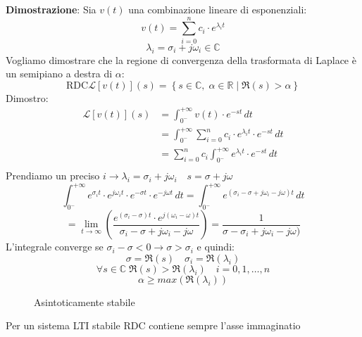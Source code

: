 \documentclass[a4paper]{article}
\begin{document}
\textbf{Dimostrazione}:
Sia \( v(t) \) una combinazione lineare di esponenziali:
\[
  v(t) = \sum_{i=0}^{n} c_i \cdot e^{\lambda_i t}
\] 
\[
\lambda_i = \sigma_i + j \omega_i \in \mathbb{C}
\] 
Vogliamo dimostrare che la regione di convergenza della trasformata di Laplace è un
semipiano a destra di \( \alpha \):
\[
  \text{RDC} \mathcal{L}[v(t)](s) = \left\{ s \in \mathbb{C},\; \alpha \in \mathbb{R} \; | \; \Re(s) > \alpha \right\}
\] 
Dimostro:
\[
  \begin{aligned}
    \mathcal{L}[v(t)](s) &= \int_{0^-}^{+\infty} v(t) \cdot e^{-st} \, dt \\
                         &= \int_{0^-}^{+\infty} \sum_{i=0}^{n} c_i \cdot e^{\lambda_i t} \cdot e^{-st} \, dt\\
                         &= \sum_{i=0}^{n} c_i \int_{0^-}^{+\infty} e^{\lambda_i t} \cdot e^{-st} \, dt\\
  \end{aligned}
\] 
Prendiamo un preciso \( i \to \lambda_i = \sigma_i + j \omega_i \quad s = \sigma + j \omega\) 
\[
  \int_{0^-}^{+\infty} e^{\sigma_i t} \cdot e^{j \omega_i t} \cdot e^{-\sigma t} \cdot e^{-j \omega t} \, dt =
  \int_{0^-}^{+\infty} e^{(\sigma_i - \sigma + j \omega_i - j \omega) t} \, dt
\] 
\[
  = \lim_{t \to \infty} \left( \frac{e^{(\sigma_i - \sigma) t} \cdot e^{j (\omega_i - \omega) t}}
  {\sigma_i - \sigma + j \omega_i - j \omega} \right)
  = \frac{1}{\sigma - \sigma_i + j \omega_i - j\omega)}
\] 
L'integrale converge se \( \sigma_i - \sigma < 0 \to \sigma > \sigma_i \) e quindi:
\[
\sigma  = \Re(s) \quad \sigma_i = \Re(\lambda_i)
\] 
\[
\forall s \in \mathbb{C} \; \Re(s) > \Re(\lambda_i) \quad i = 0,1,\ldots,n
\] 
\[
\alpha \ge max(\Re(\lambda_i))
\] 
\begin{figure}[H]
  \centering
  \caption{Asintoticamente stabile}
\end{figure}
Per un sistema LTI stabile RDC contiene sempre l'asse immaginatio
\end{document}
